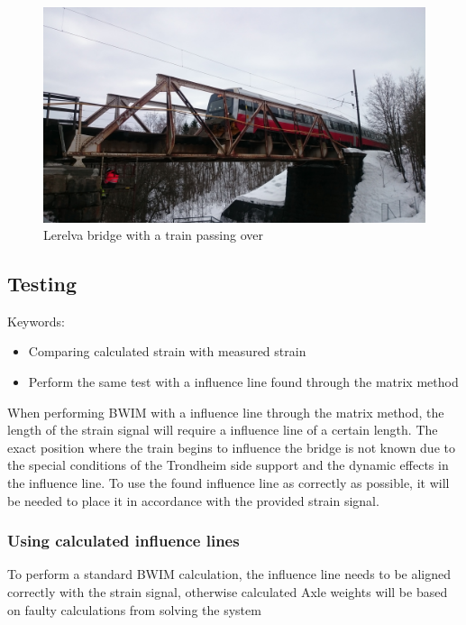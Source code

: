 \begin{figure}[H]
	\includegraphics[width=\textwidth]{figures/train_passing.jpg}
	\caption{Lerelva bridge with a train passing over}
	\label{fig:lerelva_bridge}
\end{figure}


\subsection{Testing}
Keywords:
\begin{itemize}
\item Comparing calculated strain with measured strain
\item Perform the same test with a influence line found through the matrix method
\end{itemize}

When performing BWIM with a influence line through the matrix method, the length of the strain signal will require a influence line of a certain length. The exact position where the train begins to influence the bridge is not known due to the special conditions of the Trondheim side support and the dynamic effects in the influence line.
To use the found influence line as correctly as possible, it will be needed to place it in accordance with the provided strain signal.

\subsubsection{Using calculated influence lines}
To perform a standard BWIM calculation, the influence line needs to be aligned correctly with the strain signal, otherwise calculated Axle weights will be based on faulty calculations from solving the system

